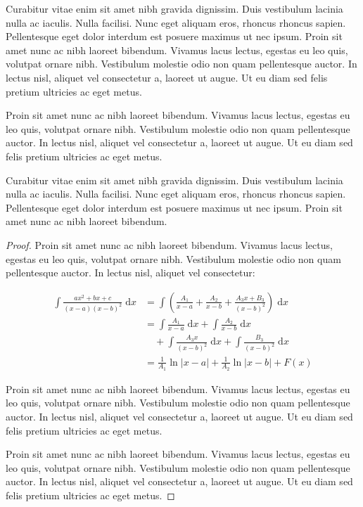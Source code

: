 Curabitur vitae enim sit amet nibh gravida dignissim. Duis vestibulum lacinia nulla ac iaculis. Nulla facilisi. Nunc eget aliquam eros, rhoncus rhoncus sapien. Pellentesque eget dolor interdum est posuere maximus ut nec ipsum. Proin sit amet nunc ac nibh laoreet bibendum. Vivamus lacus lectus, egestas eu leo quis, volutpat ornare nibh. Vestibulum molestie odio non quam pellentesque auctor. In lectus nisl, aliquet vel consectetur a, laoreet ut augue. Ut eu diam sed felis pretium ultricies ac eget metus.

Proin sit amet nunc ac nibh laoreet bibendum. Vivamus lacus lectus, egestas eu leo quis, volutpat ornare nibh. Vestibulum molestie odio non quam pellentesque auctor. In lectus nisl, aliquet vel consectetur a, laoreet ut augue. Ut eu diam sed felis pretium ultricies ac eget metus.

\begin{theorem}
Curabitur vitae enim sit amet nibh gravida dignissim. Duis vestibulum lacinia nulla ac iaculis. Nulla facilisi. Nunc eget aliquam eros, rhoncus rhoncus sapien. Pellentesque eget dolor interdum est posuere maximus ut nec ipsum. Proin sit amet nunc ac nibh laoreet bibendum.	
\end{theorem}

\begin{proof}
Proin sit amet nunc ac nibh laoreet bibendum. Vivamus lacus lectus, egestas eu leo quis, volutpat ornare nibh. Vestibulum molestie odio non quam pellentesque auctor. In lectus nisl, aliquet vel consectetur:

\begin{align}
\int \frac{ax^2+bx+c}{(x-a)(x-b)^2} \;\mathrm{d}x
& = \int \left( \frac{A_1}{x-a} + \frac{A_2}{x-b} + \frac{A_3x+B_3}{(x-b)^2} \right) \;\mathrm{d}x
\\ \nonumber
& = \int \frac{A_1}{x-a} \;\mathrm{d}x + \int \frac{A_2}{x-b} \;\mathrm{d}x 
\\
& \quad + \int \frac{A_3x}{(x-b)^2} \;\mathrm{d}x + \int \frac{B_3}{(x-b)^2} \;\mathrm{d}x
\\
& = \frac{1}{A_1} \ln \lvert x-a \rvert + \frac{1}{A_2}\ln \lvert x-b \rvert + F(x)
\end{align}

Proin sit amet nunc ac nibh laoreet bibendum. Vivamus lacus lectus, egestas eu leo quis, volutpat ornare nibh. Vestibulum molestie odio non quam pellentesque auctor. In lectus nisl, aliquet vel consectetur a, laoreet ut augue. Ut eu diam sed felis pretium ultricies ac eget metus.

Proin sit amet nunc ac nibh laoreet bibendum. Vivamus lacus lectus, egestas eu leo quis, volutpat ornare nibh. Vestibulum molestie odio non quam pellentesque auctor. In lectus nisl, aliquet vel consectetur a, laoreet ut augue. Ut eu diam sed felis pretium ultricies ac eget metus.
\end{proof}

